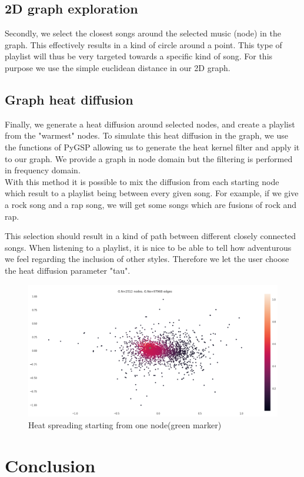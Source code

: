 \documentclass[11pt,a4paper,twoside]{article}
\begin{document}
\subsection{2D graph exploration}
Secondly, we select the closest songs around the selected music (node) in the graph. This effectively results in a kind of circle around a point. This type of playlist will thus be very targeted towards a specific kind of song. For this purpose we use the simple euclidean distance in our 2D graph.

\subsection{Graph heat diffusion}
Finally, we generate a heat diffusion around selected nodes, and create a playlist from the "warmest" nodes. To simulate this heat diffusion in the graph, we use the functions of PyGSP allowing us to generate the heat kernel filter and apply it to our graph. We provide a graph in node domain but the filtering is performed in frequency domain.\\

With this method it is possible to mix the diffusion from each starting node which result to a playlist being between every given song. For example, if we give a rock song and a rap song, we will get some songs which are fusions of rock and rap.

This selection should result in a kind of path between different closely connected songs. When listening to a playlist, it is nice to be able to tell how adventurous we feel regarding the inclusion of other styles. Therefore we let the user choose the heat diffusion parameter "tau". 

\newpage

\begin{figure}[H]
  \centering
    \includegraphics[width=\textwidth]{./Figures/heat}
  \caption{Heat spreading starting from one node(green marker)}
  \label{fig:}
\end{figure}


\section{Conclusion}
\end{document}
